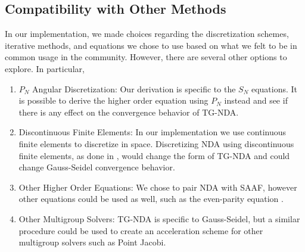 \subsection{Compatibility with Other Methods}
In our implementation, we made choices regarding the discretization schemes, iterative methods, and equations we chose to use based on what we felt to be in common usage in the community. However, there are several other options to explore. In particular, 
\begin{enumerate}
\item $P_N$ Angular Discretization:
Our derivation is specific to the $S_N$ equations. It is possible to derive the higher order equation using $P_N$ instead \cite{zheng-thesis} and see if there is any effect on the convergence behavior of TG-NDA. 
\item Discontinuous Finite Elements:
In our implementation we use continuous finite elements to discretize in space. Discretizing NDA using discontinuous finite elements, as done in \cite{Schunert2017}, would change the form of TG-NDA and could change Gauss-Seidel convergence behavior. 
\item Other Higher Order Equations:
We chose to pair NDA with SAAF, however other equations could be used as well, such as the even-parity equation \cite{Noh1996}.
\item Other Multigroup Solvers:
TG-NDA is specific to Gauss-Seidel, but a similar procedure could be used to create an acceleration scheme for other multigroup solvers such as Point Jacobi.
\end{enumerate}

